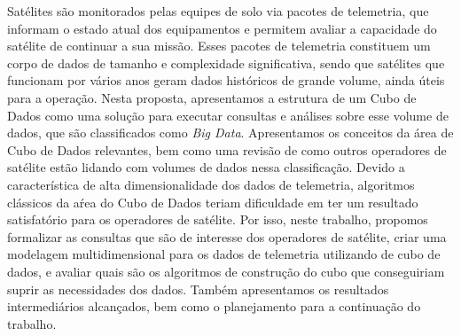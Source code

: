 
\begin{resumo}

\hypertarget{estilo:resumo}{} %

Satélites são monitorados pelas equipes de solo via pacotes de telemetria, que informam o estado atual dos equipamentos e permitem avaliar a capacidade do satélite de continuar a sua missão.
Esses pacotes de telemetria constituem um corpo de dados de tamanho e complexidade significativa, sendo que satélites que funcionam por vários anos geram dados históricos de grande volume, ainda úteis para a operação.
Nesta proposta, apresentamos a estrutura de um Cubo de Dados como uma solução para executar consultas e análises sobre esse volume de dados, que são classificados como \textit{Big Data}.
Apresentamos os conceitos da área de Cubo de Dados relevantes, bem como uma revisão de como outros operadores de satélite estão lidando com volumes de dados nessa classificação.
Devido a característica de alta dimensionalidade dos dados de telemetria, algoritmos clássicos da aŕea do Cubo de Dados teriam dificuldade em ter um resultado satisfatório para os operadores de satélite.
Por isso, neste trabalho, propomos formalizar as consultas que são de interesse dos operadores de satélite, criar uma modelagem multidimensional para os dados de telemetria utilizando de cubo de dados, e avaliar quais são os algoritmos de construção do cubo que conseguiriam suprir as necessidades dos dados.
Também apresentamos os resultados intermediários alcançados, bem como o planejamento para a continuação do trabalho.


\end{resumo}
